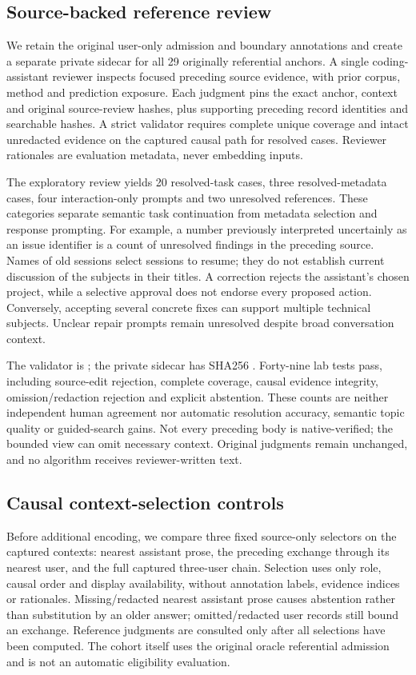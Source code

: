 \documentclass[11pt]{article}
\begin{document}
\subsection{Source-backed reference review}
We retain the original user-only admission and boundary annotations and create a
separate private sidecar for all 29 originally referential anchors. A single
coding-assistant reviewer inspects focused preceding source evidence, with prior
corpus, method and prediction exposure. Each judgment pins the exact anchor,
context and original source-review hashes, plus supporting preceding record
identities and searchable hashes. A strict validator requires complete unique
coverage and intact unredacted evidence on the captured causal path for resolved
cases. Reviewer rationales are evaluation metadata, never embedding inputs.

The exploratory review yields 20 resolved-task cases, three resolved-metadata
cases, four interaction-only prompts and two unresolved references. These
categories separate semantic task continuation from metadata selection and
response prompting. For example, a number previously interpreted uncertainly as
an issue identifier is a count of unresolved findings in the preceding source.
Names of old sessions select sessions to resume; they do not establish current
discussion of the subjects in their titles. A correction rejects the assistant's
chosen project, while a selective approval does not endorse every proposed
action. Conversely, accepting several concrete fixes can support multiple
technical subjects. Unclear repair prompts remain unresolved despite broad
conversation context.

The validator is ; the private sidecar
 has SHA256
.
Forty-nine lab tests pass, including source-edit rejection, complete coverage,
causal evidence integrity, omission/redaction rejection and explicit abstention.
These counts are neither independent human agreement nor automatic resolution
accuracy, semantic topic quality or guided-search gains. Not every preceding
body is native-verified; the bounded view can omit necessary context. Original
judgments remain unchanged, and no algorithm receives reviewer-written text.

\subsection{Causal context-selection controls}
Before additional encoding, we compare three fixed source-only selectors on the
captured contexts: nearest assistant prose, the preceding exchange through its
nearest user, and the full captured three-user chain. Selection uses only role,
causal order and display availability, without annotation labels, evidence
indices or rationales. Missing/redacted nearest assistant prose causes
abstention rather than substitution by an older answer; omitted/redacted user
records still bound an exchange. Reference judgments are consulted only after
all selections have been computed. The cohort itself uses the original oracle
referential admission and is not an automatic eligibility evaluation.
\end{document}
